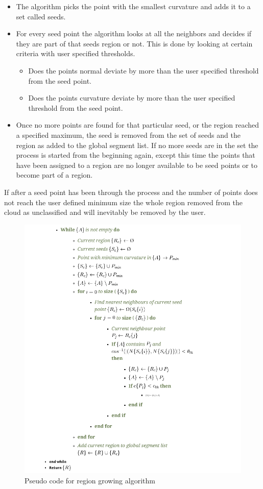	\renewcommand\labelitemi{{\boldmath$\cdot$}}
	\begin{itemize}
		\item The algorithm picks the point with the smallest curvature and adds it to a set called seeds.
		
		\item For every seed point the algorithm looks at all the neighbors and decides if they are part of that seeds region or not. This is done by looking at certain criteria with user specified thresholds.
		
		\begin{itemize}
			\item Does the points normal deviate by more than the user specified threshold from the seed point.
			
			\item Does the points curvature deviate by more than the user specified threshold from the seed point.
			
		\end{itemize}
		
		\item Once no more points are found for that particular seed, or the region reached a specified maximum, the seed is removed from the set of seeds and the region as added to the global segment list. If no more seeds are in the set the process is started from the beginning again, except this time the points that have been assigned to a region are no longer available to be seed points or to become part of a region.
		
	\end{itemize}
	
	If after a seed point has been through the process and the number of points does not reach the user defined minimum size the whole region removed from the cloud as unclassified and will inevitably be removed by the user.
	
	
	\begin{figure}[H]
		\centering
		\includegraphics[width=0.7\linewidth]{Includes/images/LitReview/RegionGrowing}
		\caption{Pseudo code for region growing algorithm}
		\label{fig:RegionGrowing}
	\end{figure}
	
